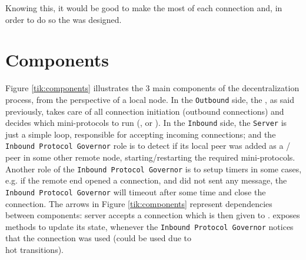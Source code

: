 Knowing this, it would be good to make the most of each connection and, in order to do so the
\Connmngr{} was designed.

\section{Components}

Figure \ref{tik:components} illustrates the 3 main components of the decentralization
process, from the perspective of a local node. In the \texttt{Outbound} side, the
\ptopgov{}, as said previously, takes care of all connection initiation (outbound
connections) and decides which mini-protocols to run (\established{}, \warm{} or \hot{}).
In the \texttt{Inbound} side, the \texttt{Server} is just a simple loop, responsible for accepting incoming
connections; and the \texttt{Inbound Protocol Governor} role is to detect if its local peer was
added as a \warm{}/\hot{} peer in some other remote node, starting/restarting the required
mini-protocols. Another role of the \texttt{Inbound Protocol Governor} is to setup timers in
some cases, e.g. if the remote end opened a connection, and did not sent any message, the
\texttt{Inbound Protocol Governor} will timeout after some time and close the connection.
The arrows in Figure \ref{tik:components} represent dependencies between components:
server accepts a connection which is then given to \Connmngr{}. \Connmngr{} exposes methods to update its state,
whenever the \texttt{Inbound Protocol Governor} notices that the connection was used
(could be used due to \warm{}\\hot{} transitions).

